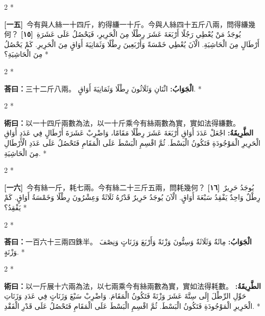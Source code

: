 \documentclass[11pt,a4paper]{article}
\newcommand{\ar}[1]{\arabicfont\beginR #1\endR}
\newcommand{\problemnum}[1]{\textbf{[\ignorespaces#1\unskip]}}
\newenvironment{bilingual}{%
  \begin{paracol}{2}%
  \switchcolumn[0]*%
}{%
  \end{paracol}%
}
\newcommand{\cnline}[1]{\switchcolumn[0]\noindent #1 \switchcolumn[1]}
\newcommand{\arline}[1]{\noindent\ar{#1} \switchcolumn[0]*}
\newenvironment{prob bilingual}{%
  \begin{paracol}{2}%
  \switchcolumn[0]*%
}{%
  \end{paracol}%
  \vspace{0.3em}%
}
\begin{document}
\begin{bilingual}
\cnline{\problemnum{一五}\, 今有與人絲一十四斤，約得縑一十斤。今與人絲四十五斤八兩，問得縑幾何？}
\arline{\problemnum{١٥}\, يُوجَدُ مَنْ يُعْطِي رَجُلًا أَرْبَعَةَ عَشَرَ رِطْلًا مِنَ الْحَرِيرِ، فَيَحْصُلُ عَلَى عَشَرَةِ أَرْطَالٍ مِنَ الْحَاشِيَةِ. الْآنَ يُعْطِي خَمْسَةً وَأَرْبَعِينَ رِطْلًا وَثَمَانِيَةَ أَوَاقٍ مِنَ الْحَرِيرِ. كَمْ يَحْصُلُ مِنَ الْحَاشِيَةِ؟}
\end{bilingual}

\begin{bilingual}
\cnline{\textcolor{answercolor}{\textbf{荅曰：}}三十二斤八兩。}
\arline{\textcolor{answercolor}{\textbf{الْجَوَابُ:}} اثْنَانِ وَثَلَاثُونَ رِطْلًا وَثَمَانِيَةَ أَوَاقٍ.}
\end{bilingual}

\begin{bilingual}
\cnline{%
\textcolor{methodcolor}{\textbf{術曰：}}以一十四斤兩數為法，以一十斤乘今有絲兩數為實，實如法得縑數。
}
\arline{%
\textcolor{methodcolor}{\textbf{الطَّرِيقَةُ:}} اجْعَلْ عَدَدَ أَوَاقِ أَرْبَعَةَ عَشَرَ رِطْلًا مَقَامًا، وَاضْرِبْ عَشَرَةَ أَرْطَالٍ فِي عَدَدِ أَوَاقِ الْحَرِيرِ الْمَوْجُودَةِ فَتَكُونُ الْبَسْطَ. ثُمَّ اقْسِمِ الْبَسْطَ عَلَى الْمَقَامِ فَتَحْصُلُ عَلَى عَدَدِ الْأَرْطَالِ مِنَ الْحَاشِيَةِ.
}
\end{bilingual}

\begin{bilingual}
\cnline{\problemnum{一六}\, 今有絲一斤，耗七兩。今有絲二十三斤五兩，問耗幾何？}
\arline{\problemnum{١٦}\, يُوجَدُ حَرِيرٌ رِطْلٌ وَاحِدٌ يَفْقِدُ سَبْعَةَ أَوَاقٍ. الْآنَ يُوجَدُ حَرِيرٌ قَدْرُهُ ثَلَاثَةٌ وَعِشْرُونَ رِطْلًا وَخَمْسَةُ أَوَاقٍ. كَمْ يَفْقِدُ؟}
\end{bilingual}

\begin{bilingual}
\cnline{\textcolor{answercolor}{\textbf{荅曰：}}一百六十三兩四銖半。}
\arline{\textcolor{answercolor}{\textbf{الْجَوَابُ:}} مِائَةٌ وَثَلَاثَةٌ وَسِتُّونَ وَزْنَةً وَأَرْبَعَ وَزَنَاتٍ وَنِصْفَ وَزْنَةٍ.}
\end{bilingual}

\begin{bilingual}
\cnline{%
\textcolor{methodcolor}{\textbf{術曰：}}以一斤展十六兩為法，以七兩乘今有絲兩數為實，實如法得耗數。
}
\arline{%
\textcolor{methodcolor}{\textbf{الطَّرِيقَةُ:}} حَوِّلِ الرِّطْلَ إِلَى سِتَّةَ عَشَرَ وَزْنَةً فَتَكُونُ الْمَقَامَ. وَاضْرِبْ سَبْعَ وَزَنَاتٍ فِي عَدَدِ وَزَنَاتِ الْحَرِيرِ الْمَوْجُودَةِ فَتَكُونُ الْبَسْطَ. ثُمَّ اقْسِمِ الْبَسْطَ عَلَى الْمَقَامِ فَتَحْصُلُ عَلَى قَدْرِ الْفَقْدِ.
}
\end{bilingual}
\end{document}
